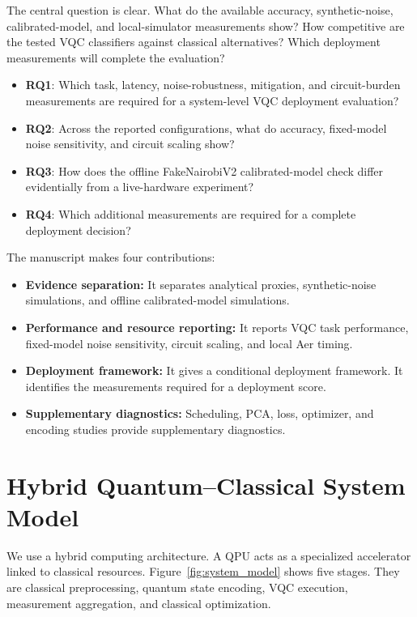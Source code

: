 \documentclass[final,5p,times,number]{elsarticle}
\begin{document}
The central question is clear. What do the available accuracy, synthetic-noise, calibrated-model, and local-simulator measurements show? How competitive are the tested VQC classifiers against classical alternatives? Which deployment measurements will complete the evaluation?

\begin{itemize}[leftmargin=*]
  \item \textbf{RQ1}: Which task, latency, noise-robustness, mitigation, and circuit-burden measurements are required for a system-level VQC deployment evaluation?
  \item \textbf{RQ2}: Across the reported configurations, what do accuracy, fixed-model noise sensitivity, and circuit scaling show?
  \item \textbf{RQ3}: How does the offline FakeNairobiV2 calibrated-model check differ evidentially from a live-hardware experiment?
  \item \textbf{RQ4}: Which additional measurements are required for a complete deployment decision?
\end{itemize}

The manuscript makes four contributions:
\begin{itemize}[leftmargin=*]
  \item \textbf{Evidence separation:} It separates analytical proxies, synthetic-noise simulations, and offline calibrated-model simulations.
  \item \textbf{Performance and resource reporting:} It reports VQC task performance, fixed-model noise sensitivity, circuit scaling, and local Aer timing.
  \item \textbf{Deployment framework:} It gives a conditional deployment framework. It identifies the measurements required for a deployment score.
  \item \textbf{Supplementary diagnostics:} Scheduling, PCA, loss, optimizer, and encoding studies provide supplementary diagnostics.
\end{itemize}

\section{Hybrid Quantum--Classical System Model}
\label{sec:system}

We use a hybrid computing architecture. A QPU acts as a specialized accelerator linked to classical resources. Figure~\ref{fig:system_model} shows five stages. They are classical preprocessing, quantum state encoding, VQC execution, measurement aggregation, and classical optimization.
\end{document}
